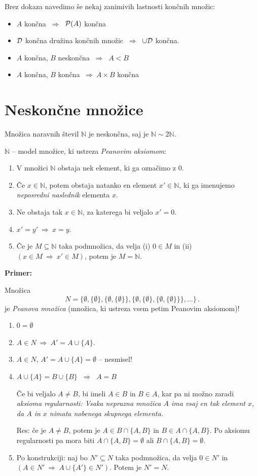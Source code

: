 \documentclass[11pt,paper=b5,DIV=13,headinclude,footinclude]{scrbook}
\def\sledi {{~\Rightarrow~}}
\begin{document}
Brez dokaza navedimo še nekaj zanimivih lastnosti končnih množic:
\begin{itemize}
  \item $A$ končna $\sledi$ ${\cal P}(A)$ končna
  \item ${\cal D}$ končna družina končnih množic $\sledi$ $\cup {\cal D}$ končna.
  \item $A$ končna, $B$ neskončna $\sledi$ $A<B$
  \item $A$ končna, $B$ končna $\sledi A\times B$ končna
\end{itemize}

\section{Neskončne množice}

Množica naravnih števil $\mathbb{N}$ je neskončna, saj je $\mathbb{N}\sim 2\mathbb{N}$.

$\mathbb{N}$  -- model množice, ki ustreza {\em Peanovim aksiomom}:
\begin{enumerate}[1.)]
  \item V množici $\mathbb{N}$ obstaja nek element, ki ga označimo z 0.
  \item Če $x\in \mathbb{N}$, potem obstaja natanko en element $x'\in \mathbb{N}$, ki ga imenujemo {\em neposredni naslednik} elementa $x$.
  \item Ne obstaja tak $x\in \mathbb{N}$, za katerega bi veljalo $x' = 0$.
  \item $x' = y' \sledi x = y$.
  \item Če je $M\subseteq \mathbb{N}$ taka podmnožica, da velja (i) $0\in M$ in (ii) $(x\in M\sledi x'\in M)$, potem je $M = \mathbb{N}$.
\end{enumerate}

\textbf{Primer:}

Množica
$$N = \{\emptyset, \{\emptyset\}, \{\emptyset, \{\emptyset\}\},
\{\emptyset, \{\emptyset\}, \{\emptyset, \{\emptyset\}\}\},\ldots \}\,.$$
je {\em Peanova množica} (množica, ki ustreza vsem petim Peanovim aksiomom)!

\begin{enumerate}
  \item $0 = \emptyset$
  \item $A\in N\sledi A' = A\cup \{A\}$.
  \item $A\in N$, $A' = A\cup \{A\}= \emptyset$ -- nesmisel!
  \item $A\cup \{A\} = B\cup \{B\}$ $\sledi$ $A = B$

  Če bi veljalo $A\neq B$, bi imeli $A\in B$ in $B\in A$, kar pa ni možno zaradi {\em aksioma regularnosti: Vsaka neprazna množica $A$ ima vsaj en tak element $x$, da $A$ in $x$ nimata nobenega skupnega elementa.}

  Res: če je $A\neq B$, potem je $A\in B\cap \{A,B\}$ in $B\in A\cap \{A,B\}$.
  Po aksiomu regularnosti pa mora biti
  $A\cap \{A,B\}= \emptyset$ ali  $B\cap \{A,B\}= \emptyset$.

  \item Po konstrukciji: naj bo $N'\subseteq N$ taka podmnožica, da velja
  $0\in N'$ in $(A\in N'\sledi A\cup \{A'\}\in N')$. Potem je  $N' = N$.
\end{enumerate}
\end{document}
